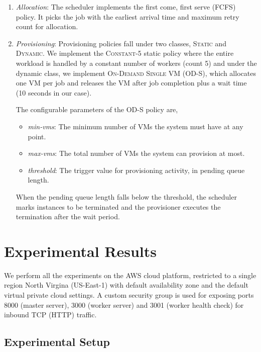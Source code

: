 \documentclass[a4paper]{IEEEtran}
\begin{document}
\begin{enumerate}
  \item \emph{Allocation}: The scheduler implements the first come, first serve (FCFS) policy.
  It picks the job with the earliest arrival time and maximum retry count for allocation.

  \item \emph{Provisioning}: Provisioning policies fall under two classes, \textsc{Static} and \textsc{Dynamic}. We implement the \textsc{Constant-5} static policy where the entire workload
  is handled by a constant number of workers (count 5) and under the dynamic class, we implement
  \textsc{On-Demand Single VM (OD-S)}, which allocates one VM per job and releases the VM after job completion plus a wait time (10 seconds in our case).

  The configurable parameters of the OD-S policy are,
    \begin{itemize}
      \item \emph{min-vms}: The minimum number of VMs the system must have at any point.
      \item \emph{max-vms}: The total number of VMs the system can provision at most.
      \item \emph{threshold}: The trigger value for provisioning activity, in pending queue length.
    \end{itemize} 

  When the pending queue length falls below the threshold, the scheduler marks instances to be
  terminated and the provisioner executes the termination after the wait period.
\end{enumerate}

\section{Experimental Results} \label{experiments}

We perform all the experiments on the AWS cloud platform, restricted to a single region North Virgina (US-East-1) with default availability zone and the default virtual private cloud settings.
A custom security group is used for exposing ports 8000 (master server), 3000 (worker server) and 3001 (worker health check) for inbound TCP (HTTP) traffic.

\subsection{Experimental Setup}
\end{document}
